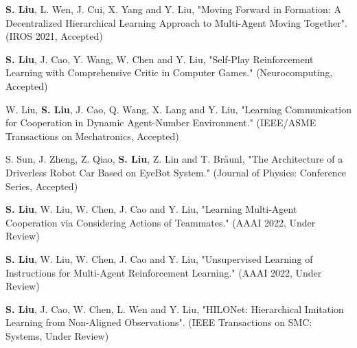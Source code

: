 \begin{itemize}[leftmargin=*]
  {\small

  \item
  \textbf{S. Liu}, L. Wen, J. Cui, X. Yang and Y. Liu, "Moving Forward in Formation: A Decentralized Hierarchical Learning Approach to Multi-Agent Moving Together". (IROS 2021, Accepted)
  \item
  \textbf{S. Liu}, J. Cao, Y. Wang, W. Chen and Y. Liu, "Self-Play Reinforcement Learning with Comprehensive Critic in Computer Games." (Neurocomputing, Accepted)
  \item
  W. Liu, \textbf{S. Liu}, J. Cao, Q. Wang, X. Lang and Y. Liu, "Learning Communication for Cooperation in Dynamic Agent-Number Environment." (IEEE/ASME Transactions on Mechatronics, Accepted)
  \item 
  S. Sun, J. Zheng, Z. Qiao, \textbf{S. Liu}, Z. Lin and T. Bräunl, "The Architecture of a Driverless Robot Car Based on EyeBot System." (Journal of Physics: Conference Series, Accepted)
  \item
  \textbf{S. Liu}, W. Liu, W. Chen, J. Cao and Y. Liu, "Learning Multi-Agent Cooperation via Considering Actions of Teammates." (AAAI 2022, Under Review)
  \item
  \textbf{S. Liu}, W. Liu, W. Chen, J. Cao and Y. Liu, "Unsupervised Learning of Instructions for Multi-Agent Reinforcement Learning." (AAAI 2022, Under Review)
  \item
  \textbf{S. Liu}, J. Cao, W. Chen, L. Wen and Y. Liu, "HILONet: Hierarchical Imitation Learning from Non-Aligned Observations". (IEEE Transactions on SMC: Systems, Under Review)}

\end{itemize}